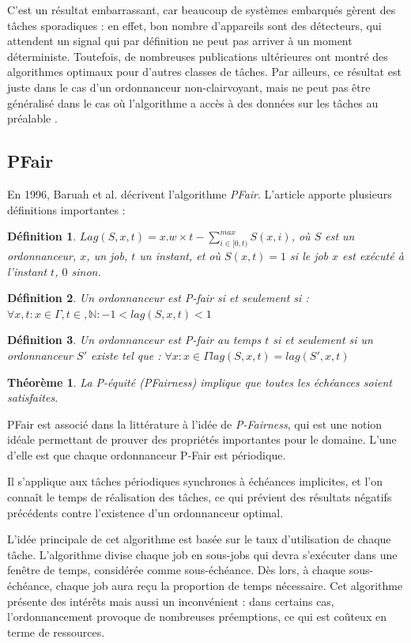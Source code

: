 \documentclass[11pt,a4paper,oneside]{report}
\newtheorem{mydef}{Définition}
\newtheorem{mytheorem}{Théorème}
\begin{document}
	C'est un résultat embarrassant, car beaucoup de systèmes embarqués gèrent des tâches sporadiques :
	en effet, bon nombre d'appareils sont des détecteurs, qui attendent un signal qui par définition 
	ne peut pas arriver à un moment déterministe. 
	Toutefois, de nombreuses publications ultérieures ont montré des algorithmes 
	optimaux pour d'autres classes de tâches. Par ailleurs, ce résultat est juste dans le cas 
	d'un ordonnanceur non-clairvoyant, mais ne peut pas être généralisé dans le cas où 
	l'algorithme a accès à des données sur les tâches au préalable \cite{fisher_optimal_2010}.
	
	\subsection{PFair}
	En 1996, Baruah et al. décrivent l'algorithme \textit{PFair}.
	L'article apporte plusieurs définitions importantes :
	\begin{mydef} %
		$Lag(S, x, t) = x.w \times t - \sum_{i\in[0,t)}^{max} S(x, i)$, où 
		$S$ est un ordonnanceur, $x$, un job, $t$ un instant, et où $S(x, t) = 1$ si 
		le job $x$ est exécuté à l'instant $t$, $0$ sinon.
	\end{mydef}
	\begin{mydef}
		Un ordonnanceur est P-fair si et seulement si :\medskip
		$\forall x, t : x \in \Gamma, t\in , \mathbb{N} : -1 < lag(S,x,t) < 1$
	\end{mydef}
	\begin{mydef}
		Un ordonnanceur est P-fair au temps $t$ si et seulement si un ordonnanceur $S'$ existe tel que : \medskip
		$\forall x: x \in \Gamma  lag(S,x,t) = lag(S',x,t)$
	\end{mydef}
	\begin{mytheorem}
		La P-équité (PFairness) implique que toutes les échéances soient satisfaites.
	\end{mytheorem}
	
	PFair est associé dans la littérature à l'idée de \textit{P-Fairness}, qui est une notion 
	idéale permettant de prouver des propriétés importantes pour le domaine. 
	L'une d'elle est que chaque ordonnanceur P-Fair est périodique. \medskip
	
	Il s'applique aux tâches périodiques synchrones à échéances implicites, 
	et l'on connaît le temps de réalisation des tâches, 
	ce qui prévient des résultats négatifs précédents contre 
	l'existence d'un ordonnanceur optimal.\medskip
	
	L'idée principale de cet algorithme est basée sur le taux d'utilisation de chaque tâche. 
	L'algorithme divise chaque job en sous-jobs qui devra s'exécuter dans une fenêtre de temps, 
	considérée comme sous-échéance. Dès lors, à chaque sous-échéance, 
	chaque job aura reçu la proportion de temps nécessaire. 
	Cet algorithme présente des intérêts mais aussi un inconvénient : dans certains cas, 
	l'ordonnancement provoque de nombreuses préemptions, ce qui est coûteux en terme de ressources.\medskip
	
\end{document}
